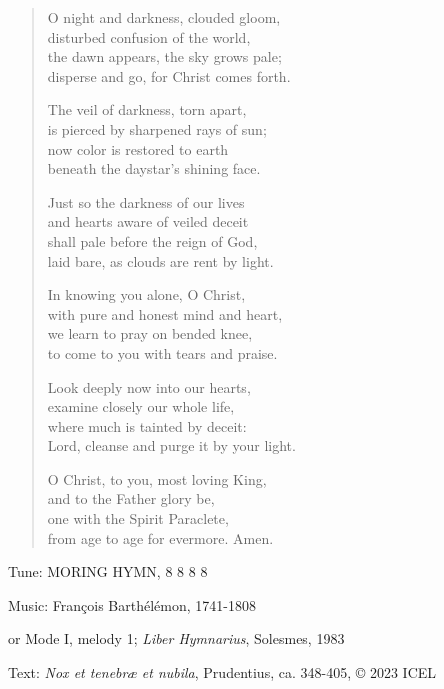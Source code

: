 \hymn

\begin{verse}
O night and darkness, clouded gloom,\\
disturbed confusion of the world,\\
the dawn appears, the sky grows pale;\\
disperse and go, for Christ comes forth.

The veil of darkness, torn apart,\\
is pierced by sharpened rays of sun;\\
now color is restored to earth\\
beneath the daystar’s shining face.

Just so the darkness of our lives\\
and hearts aware of veiled deceit\\
shall pale before the reign of God,\\
laid bare, as clouds are rent by light.

In knowing you alone, O Christ,\\
with pure and honest mind and heart,\\
we learn to pray on bended knee,\\
to come to you with tears and praise.

Look deeply now into our hearts,\\
examine closely our whole life,\\
where much is tainted by deceit:\\
Lord, cleanse and purge it by your light.

O Christ, to you, most loving King,\\
and to the Father glory be,\\
one with the Spirit Paraclete,\\
from age to age for evermore. Amen.
\end{verse}

\begin{hymnsource}
Tune: MORING HYMN, 8 8 8 8

Music: François Barthélémon, 1741-1808

or Mode I, melody 1; \emph{Liber Hymnarius}, Solesmes, 1983

Text: \emph{Nox et tenebræ et nubila}, Prudentius, ca. 348-405, © 2023 ICEL
\end{hymnsource}